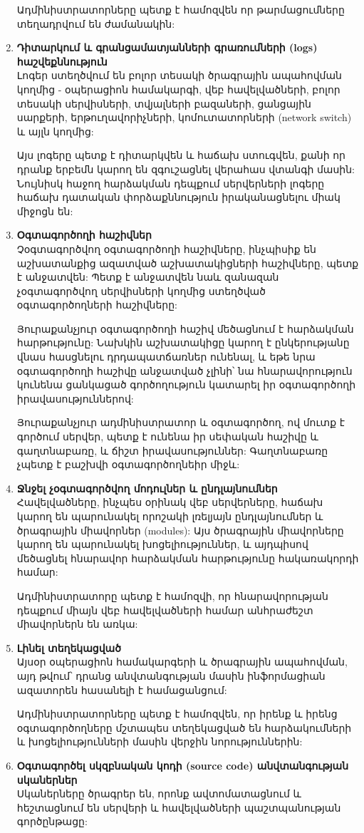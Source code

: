 \documentclass[a4paper,12pt]{article}
\begin{document}
\begin{sloppypar}
\begin{enumerate}
    Ադմինիստրատորները պետք է համոզվեն որ թարմացումները տեղադրվում են
    ժամանակին:
\item \textbf{Դիտարկում և գրանցամատյանների գրառումների (logs) հաշվեքննություն}\\
    Լոգեր ստեղծվում են բոլոր տեսակի ծրագրային ապահովման կողմից -
    օպերացիոն համակարգի, վեբ հավելվածների, բոլոր տեսակի սերվիսների,
    տվյալների բազաների, ցանցային սարքերի, երթուղավորիչների, կոմուտատորների (network switch)
	և այլն կողմից:

    Այս լոգերը պետք է դիտարկվեն և հաճախ ստուգվեն, քանի որ դրանք երբեմն
    կարող են զգուշացնել վերահաս վտանգի մասին: Նույնիսկ հաջող հարձակման
    դեպքում սերվերների լոգերը հաճախ դատական փորձաքննություն
    իրականացնելու միակ միջոցն են:
\item \textbf{Օգտագործողի հաշիվներ}\\
    Չօգտագործվող օգտագործողի հաշիվները, ինչպիսիք են աշխատանքից ազատված
    աշխատակիցների հաշիվները, պետք է անջատվեն: Պետք է անջատվեն նաև զանազան
    չօգտագործվող սերվիսների կողմից ստեղծված օգտագործողների հաշիվները:

	Յուրաքանչյուր օգտագործողի հաշիվ մեծացնում է հարձակման հարթությունը:
	Նախկին աշխատակիցը կարող է ընկերությանը վնաս հասցնելու դրդապատճառներ
	ունենալ, և եթե նրա օգտագործողի հաշիվը անջատված չլինի՝
	նա հնարավորություն կունենա ցանկացած գործողություն կատարել
	իր օգտագործողի իրավասություններով:

    Յուրաքանչյուր ադմինիստրատոր և օգտագործող, ով մուտք է գործում
    սերվեր, պետք է ունենա իր սեփական հաշիվը և գաղտնաբառը, և ճիշտ
    իրավասություններ: Գաղտնաբառը չպետք է բաշխվի օգտագործողնեիր միջև:
\item \textbf{Ջնջել չօգտագործվող մոդուլներ և ընդլայնումներ}\\
    Հավելվածները, ինչպես օրինակ վեբ սերվերները, հաճախ կարող են պարունակել
    որոշակի լռելյայն ընդլայնումներ և ծրագրային միավորներ (modules):
    Այս ծրագրային միավորները կարող են պարունակել խոցելիություններ, և
    այդպիսով մեծացնել հնարավոր հարձակման հարթությունը հակառակորդի համար:

    Ադմինիստրատորը պետք է համոզվի, որ հնարավորության դեպքում միայն
    վեբ հավելվածների համար անհրաժեշտ միավորներն են առկա:
\item \textbf{Լինել տեղեկացված}\\
    Այսօր օպերացիոն համակարգերի և ծրագրային ապահովման,
    այդ թվում՝ դրանց անվտանգության մասին ինֆորմացիան ազատորեն հասանելի է
    համացանցում:

    Ադմինիստրատորները պետք է համոզվեն, որ իրենք և իրենց օգտագործողները
    մշտապես տեղեկացված են հարձակումների և խոցելիությունների մասին
    վերջին նորություններին:
\item \textbf{Օգտագործել սկզբնական կոդի (source code) անվտանգության սկաներներ}\\
    Սկաներները ծրագրեր են, որոնք ավտոմատացնում և հեշտացնում են սերվերի
    և հավելվածների պաշտպանության գործընթացը:


\end{enumerate}
\end{sloppypar}
\end{document}
